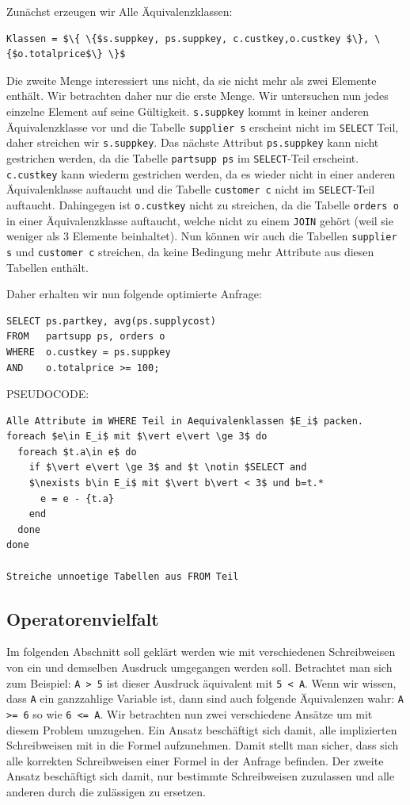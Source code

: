 Zunächst erzeugen wir Alle Äquivalenzklassen:
\begin{lstlisting}[mathescape]
Klassen = $\{ \{$s.suppkey, ps.suppkey, c.custkey,o.custkey $\}, \{$o.totalprice$\} \}$
\end{lstlisting}

Die zweite Menge interessiert uns nicht, da sie nicht mehr als zwei Elemente enthält. Wir betrachten daher nur die erste Menge. Wir untersuchen nun jedes einzelne Element auf seine Gültigkeit. \verb|s.suppkey| kommt in keiner anderen Äquivalenzklasse vor und die Tabelle \verb|supplier s| erscheint nicht im \verb|SELECT| Teil, daher streichen wir \verb|s.suppkey|. Das nächste Attribut \verb|ps.suppkey| kann nicht gestrichen werden, da die Tabelle \verb|partsupp ps| im \verb|SELECT|-Teil erscheint. \verb|c.custkey| kann wiederm gestrichen werden, da es wieder nicht in einer anderen Äquivalenklasse auftaucht und die Tabelle \verb|customer c| nicht im \verb|SELECT|-Teil auftaucht. Dahingegen ist \verb|o.custkey| nicht zu streichen, da die Tabelle \verb|orders o| in einer Äquivalenzklasse auftaucht, welche nicht zu einem \verb|JOIN| gehört (weil sie weniger als 3 Elemente beinhaltet). Nun können wir auch die Tabellen \verb|supplier s| und \verb|customer c| streichen, da keine Bedingung mehr Attribute aus diesen Tabellen enthält.

Daher erhalten wir nun folgende optimierte Anfrage:
\begin{lstlisting}[mathescape]
SELECT ps.partkey, avg(ps.supplycost)
FROM   partsupp ps, orders o
WHERE  o.custkey = ps.suppkey 
AND    o.totalprice >= 100;
\end{lstlisting}

PSEUDOCODE:

\begin{lstlisting}[mathescape]
Alle Attribute im WHERE Teil in Aequivalenklassen $E_i$ packen.
foreach $e\in E_i$ mit $\vert e\vert \ge 3$ do
  foreach $t.a\in e$ do
    if $\vert e\vert \ge 3$ and $t \notin $SELECT and 
    $\nexists b\in E_i$ mit $\vert b\vert < 3$ und b=t.*
      e = e - {t.a}
    end
  done
done

Streiche unnoetige Tabellen aus FROM Teil 
\end{lstlisting}

\subsection{Operatorenvielfalt}

Im folgenden Abschnitt soll geklärt werden wie mit verschiedenen Schreibweisen von ein und demselben Ausdruck umgegangen werden soll. Betrachtet man sich zum Beispiel: \verb|A > 5| ist dieser Ausdruck äquivalent mit \verb|5 < A|. Wenn wir wissen, dass \verb|A| ein ganzzahlige Variable ist, dann sind auch folgende Äquivalenzen wahr: \verb|A >= 6| so wie \verb|6 <= A|. Wir betrachten nun zwei verschiedene Ansätze um mit diesem Problem umzugehen. Ein Ansatz beschäftigt sich damit, alle implizierten Schreibweisen mit in die Formel aufzunehmen. Damit stellt man sicher, dass sich alle korrekten Schreibweisen einer Formel in der Anfrage befinden. Der zweite Ansatz beschäftigt sich damit, nur bestimmte Schreibweisen zuzulassen und alle anderen durch die zulässigen zu ersetzen.

